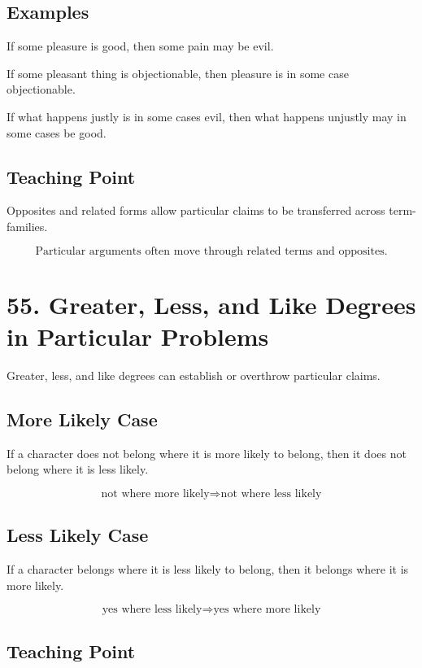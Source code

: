 \documentclass[12pt]{article}
\begin{document}
\subsection*{Examples}

If some pleasure is good, then some pain may be evil.

If some pleasant thing is objectionable, then pleasure is in some case
objectionable.

If what happens justly is in some cases evil, then what happens unjustly may in
some cases be good.

\subsection*{Teaching Point}

Opposites and related forms allow particular claims to be transferred across
term-families.

\[
\boxed{
\text{Particular arguments often move through related terms and opposites.}
}
\]

\section*{55. Greater, Less, and Like Degrees in Particular Problems}

Greater, less, and like degrees can establish or overthrow particular claims.

\subsection*{More Likely Case}

If a character does not belong where it is more likely to belong, then it does
not belong where it is less likely.

\[
\text{not where more likely} \Rightarrow \text{not where less likely}
\]

\subsection*{Less Likely Case}

If a character belongs where it is less likely to belong, then it belongs where
it is more likely.

\[
\text{yes where less likely} \Rightarrow \text{yes where more likely}
\]

\subsection*{Teaching Point}
\end{document}
